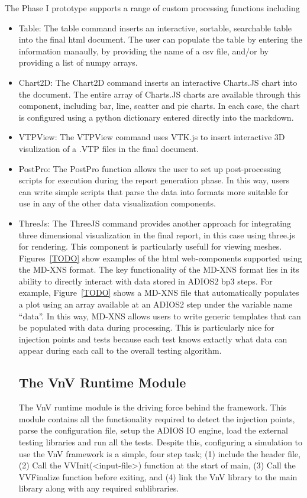 The Phase I prototype supports a range of custom processing functions including 
\begin{itemize}
\item Table: The table command inserts an interactive, sortable, searchable table into the final html document. The user can populate the table by entering the information
manaully, by providing the name of a csv file, and/or by providing a list of numpy arrays. 
\item Chart2D: The Chart2D command inserts an interactive Charts.JS chart into the document. The entire array of Charts.JS charts are available through this component, including bar, 
line, scatter and pie charts. In each case, the chart is configured using a python dictionary entered directly into the markdown. 
\item VTPView: The VTPView command uses VTK.js to insert interactive 3D visulization of a .VTP files in the final document. 
\item PostPro: The PostPro function allows the user to set up post-processing scripts for execution during the report generation phase. In this way,
users can write simple scripts that parse the data into formats more suitable for use in any of the other data visualization components. 
\item ThreeJs: The ThreeJS command provides another approach for integrating three dimensional visualization in the final report, in this case using three.js for rendering. This 
component is particularly usefull for viewing meshes. 
Figures~\ref{TODO} show examples of the html web-components supported using the MD-XNS format. The key functionality of the MD-XNS format lies in its ability to directly interact with data stored in ADIOS2 bp3 steps. For example, Figure~\ref{TODO} shows a MD-XNS file that automatically populates a plot using an array available at an ADIOS2 step under the variable name ``data''. In this way, MD-XNS allows users to write generic templates that can be populated with data during processing. This is particularly nice for \VV injection points and \VV tests because each test knows extactly what data can appear during each call to the overall testing algorithm. 


\subsection{The VnV Runtime Module}

The VnV runtime module is the driving force behind the framework. This module contains all the functionality required  to detect the injection points, parse the
configuration file, setup the ADIOS IO engine, load the external testing libraries and run all the tests. Despite this, configuring a simulation to use the VnV 
framework is a simple, four step task; (1) include the header file, (2) Call the VVInit(<input-file>) function at the start of main, (3) Call the VVFinalize function
before exiting, and (4) link the VnV library to the main library along with any required sublibraries. 


\end{itemize}
